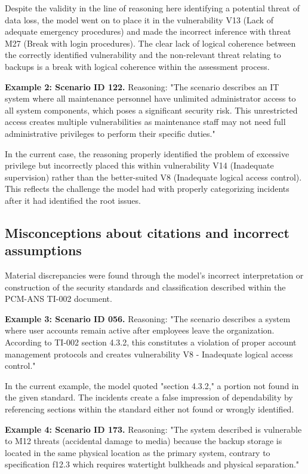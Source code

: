 \documentclass[sigconf]{acmart}
\begin{document}
Despite the validity in the line of reasoning here identifying a potential threat of data loss, the model went on to place it in the vulnerability V13 (Lack of adequate emergency procedures) and made the incorrect inference with threat M27 (Break with login procedures). The clear lack of logical coherence between the correctly identified vulnerability and the non-relevant threat relating to backups is a break with logical coherence within the assessment process.

\textbf{Example 2: Scenario ID 122.} Reasoning: "The scenario describes an IT system where all maintenance personnel have unlimited administrator access to all system components, which poses a significant security risk. This unrestricted access creates multiple vulnerabilities as maintenance staff may not need full administrative privileges to perform their specific duties."

In the current case, the reasoning properly identified the problem of excessive privilege but incorrectly placed this within vulnerability V14 (Inadequate supervision) rather than the better-suited V8 (Inadequate logical access control). This reflects the challenge the model had with properly categorizing incidents after it had identified the root issues.

\subsection{Misconceptions about citations and incorrect assumptions}
Material discrepancies were found through the model's incorrect interpretation or construction of the security standards and classification described within the PCM-ANS TI-002 document.

\textbf{Example 3: Scenario ID 056.} Reasoning: "The scenario describes a system where user accounts remain active after employees leave the organization. According to TI-002 section 4.3.2, this constitutes a violation of proper account management protocols and creates vulnerability V8 - Inadequate logical access control."

In the current example, the model quoted "section 4.3.2," a portion not found in the given standard. The incidents create a false impression of dependability by referencing sections within the standard either not found or wrongly identified.

\textbf{Example 4: Scenario ID 173.} Reasoning: "The system described is vulnerable to M12 threats (accidental damage to media) because the backup storage is located in the same physical location as the primary system, contrary to specification f12.3 which requires watertight bulkheads and physical separation."
\end{document}
